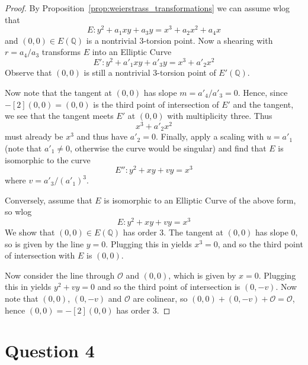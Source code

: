 \documentclass{scrartcl}
\newcommand{\Q}{\mathbb{Q}}
\renewcommand{\O}{\mathcal{O}}
\theoremstyle{definition}
\begin{document}
\begin{proof}
    By Proposition~\ref{prop:weierstrass_transformations} we can assume wlog that
    \begin{equation*}
        E: y^2 + a_1 x y + a_3 y = x^3 + a_2 x^2 + a_4 x
    \end{equation*}
    and $(0, 0) \in E(\Q)$ is a nontrivial 3-torsion point.
    Now a shearing with $r = a_4 / a_3$ transforms $E$ into an Elliptic Curve
    \begin{equation*}
        E': y^2 + a'_1 x y + a'_3 y = x^3 + a'_2 x^2
    \end{equation*}
    Observe that $(0, 0)$ is still a nontrivial 3-torsion point of $E'(\Q)$.

    Now note that the tangent at $(0, 0)$ has slope $m = a'_4/a'_3 = 0$.
    Hence, since $-[2](0, 0) = (0, 0)$ is the third point of intersection of $E'$ and the tangent, we see that the tangent meets $E'$ at $(0, 0)$ with multiplicity three.
    Thus
    \begin{equation*}
        x^3 + a'_2 x^2 
    \end{equation*}
    must already be $x^3$ and thus have $a'_2 = 0$.
    Finally, apply a scaling with $u = a'_1$ (note that $a'_1 \neq 0$, otherwise the curve would be singular) and find that $E$ is isomorphic to the curve
    \begin{equation*}
        E'': y^2 + x y + v y = x^3
    \end{equation*}
    where $v = a'_3 / (a'_1)^3$.

    Conversely, assume that $E$ is isomorphic to an Elliptic Curve of the above form, so wlog
    \begin{equation*}
        E: y^2 + x y + v y = x^3
    \end{equation*}
    We show that $(0, 0) \in E(\Q)$ has order 3.
    The tangent at $(0, 0)$ has slope $0$, so is given by the line $y = 0$.
    Plugging this in yields $x^3 = 0$, and so the third point of intersection with $E$ is $(0, 0)$.
    
    Now consider the line through $\O$ and $(0, 0)$, which is given by $x = 0$.
    Plugging this in yields $y^2 + v y = 0$ and so the third point of intersection is $(0, -v)$.
    Now note that $(0, 0)$, $(0, -v)$ and $\O$ are colinear, so $(0, 0) + (0, -v) + \O = \O$, hence $(0, 0) = -[2](0, 0)$ has order 3.
\end{proof}

\section{Question 4}
\end{document}
